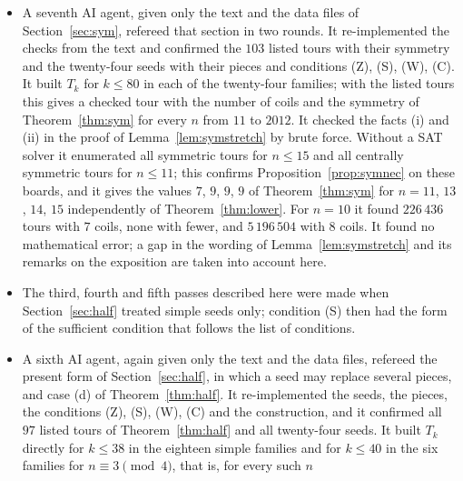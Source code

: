 \documentclass[11pt]{amsart}
\theoremstyle{remark}
\begin{document}
\begin{itemize}
and~\ref{rem:fast}; these are corrected here. In a second round it refereed Theorem~\ref{thm:symmax}: it confirmed
the $38$ tours and the twenty-four seeds with their symmetry and with condition (Z$''$), built $T_k$ with its
symmetry for $k\le40$ in each family, that is, for every $n$ from $72$ to $1007$, and checked the facts (i) and (ii)
of the proof by brute force. By enumeration it found the greatest numbers of coils $9$, $9$, $11$, $11$ of the
centrally symmetric tours for $n=10,\dots,13$. It found no error and no gap in this theorem, and two more
inaccurate sentences, which are corrected.
\item A seventh AI agent, given only the text and the data files of Section~\ref{sec:sym}, refereed that section
in two rounds. It re-implemented the checks from the text and confirmed the $103$ listed tours with their symmetry
and the twenty-four seeds with their pieces and conditions (Z), (S), (W), (C). It built $T_k$ for $k\le80$ in each
of the twenty-four families; with the listed tours this gives a checked tour with the number of coils and the
symmetry of Theorem~\ref{thm:sym} for every $n$ from $11$ to $2012$. It checked the facts (i) and (ii) in the proof
of Lemma~\ref{lem:symstretch} by brute force. Without a SAT solver it enumerated all symmetric tours for $n\le15$
and all centrally symmetric tours for $n\le11$; this confirms Proposition~\ref{prop:symnec} on these boards, and it
gives the values $7$, $9$, $9$, $9$ of Theorem~\ref{thm:sym} for $n=11$, $13$, $14$, $15$ independently of
Theorem~\ref{thm:lower}. For $n=10$ it found $226\,436$ tours with $7$ coils, none with fewer, and $5\,196\,504$ with
$8$ coils. It found no mathematical error; a gap in the wording of Lemma~\ref{lem:symstretch} and its remarks on the
exposition are taken into account here.
\item The third, fourth and fifth passes described here were made when Section~\ref{sec:half} treated simple seeds
only; condition (S) then had the form of the sufficient condition that follows the list of conditions.
\item A sixth AI agent, again given only the text and the data files, refereed the present form of
Section~\ref{sec:half}, in which a seed may replace several pieces, and case (d) of Theorem~\ref{thm:half}. It
re-implemented the seeds, the pieces, the conditions (Z), (S), (W), (C) and the construction, and it confirmed all
$97$ listed tours of Theorem~\ref{thm:half} and all twenty-four seeds. It built $T_k$ directly for $k\le38$ in the
eighteen simple families and for $k\le40$ in the six families for $n\equiv3\pmod 4$, that is, for every such $n$

\end{itemize}
\end{document}
